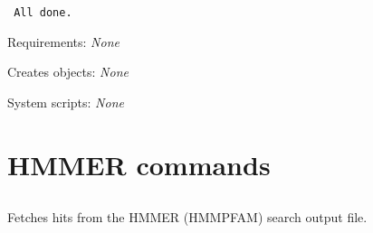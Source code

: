 \begin{description}
\begin{enumerate}
\begin{verbatim}
 All done.
\end{verbatim}

\end{enumerate}


\item{Requirements:} {\em None}


\item{Creates objects:} {\em None}


\item{System scripts:} {\em None}

\end{description}


\section{HMMER commands}


\subsection[hmm\_score\_extract]{  }



Fetches hits from the HMMER (HMMPFAM) search output file.


